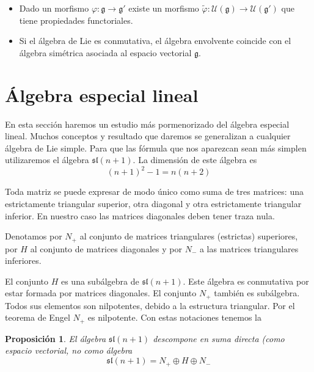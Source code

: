 \documentclass[a4paper,draft,12pt]{scrartcl}
\newtheorem{propo}[teo]{Proposición}%
\newcommand{\uni}{\mathcal{U}}%
\begin{document}
\bigskip
{}

\begin{itemize}

\item Dado un morfismo $\varphi: \mathfrak{g}\rightarrow \mathfrak{g}'$ existe un morfismo $\tilde \varphi: \uni(\mathfrak{g}) \rightarrow \uni(\mathfrak{g}')$ que tiene propiedades functoriales.

\item Si el álgebra de Lie es conmutativa, el álgebra envolvente coincide con el álgebra simétrica asociada al espacio vectorial $\mathfrak{g}$.

\end{itemize}

\newpage

\section{Álgebra especial lineal}

En esta sección haremos un estudio más pormenorizado del álgebra especial lineal.  Muchos conceptos y resultado que daremos se generalizan a cualquier álgebra de Lie simple.  Para que las fórmula que nos aparezcan sean más simplen utilizaremos el álgebra $\mathfrak{sl}(n+1)$.  La dimensión de este álgebra es
$$
(n+1)^2-1= n(n+2)
$$

\bigskip

Toda matriz se puede expresar de modo único como suma de tres matrices: una estrictamente triangular superior, otra diagonal y otra estrictamente triangular inferior. En nuestro caso las matrices diagonales deben tener traza nula.

Denotamos por $N_+$ al conjunto de matrices triangulares (estrictas) superiores, por $H$ al conjunto de matrices diagonales y por $N_-$ a las matrices triangulares inferiores.

El conjunto $H$ es una subálgebra de $\mathfrak{sl}(n+1)$.  Este álgebra es conmutativa por estar formada por matrices diagonales.  El conjunto $N_+$ también es subálgebra.  Todos sus elementos son nilpotentes, debido a la estructura triangular.  Por el teorema de Engel $N_+$ es nilpotente.  Con estas notaciones tenemos la

\begin{propo}El álgebra $\mathfrak{sl}(n+1)$ descompone en suma directa (como espacio vectorial, no como  álgebra
$$
\mathfrak{sl}(n+1)= N_+ \oplus H \oplus N_-
$$

\end{propo}
\end{document}
